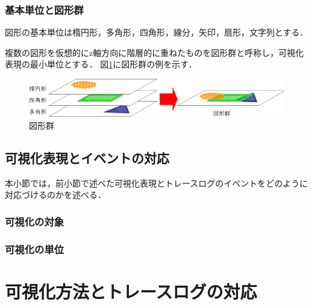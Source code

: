 \subsubsection{基本単位と図形群}
図形の基本単位は楕円形，多角形，四角形，線分，矢印，扇形，文字列とする．

複数の図形を仮想的にz軸方向に階層的に重ねたものを図形群と呼称し，可視化表現の最小単位とする．
図\ref{fig:shapes}に図形群の例を示す．

\begin{figure}[p]
\begin{center}
\includegraphics[scale=0.75]{img/shapes.eps}
\caption{図形群}
\label{fig:shapes}
\end{center}
\end{figure}

\subsection{可視化表現とイベントの対応}

本小節では，前小節で述べた可視化表現とトレースログのイベントをどのように対応づけるのかを述べる．

\subsubsection{可視化の対象}



\subsubsection{可視化の単位}


\section{可視化方法とトレースログの対応}
